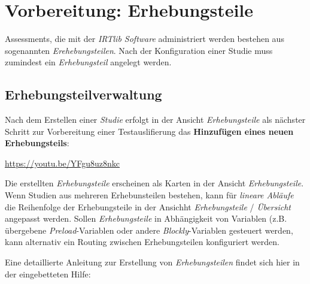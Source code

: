 \documentclass[
  letterpaper,
  DIV=11]{scrreprt}
\begin{document}
\let\clearpage\standardclearpage


\hypertarget{vorbereitung-erhebungsteile-1}{%
\chapter{Vorbereitung:
Erhebungsteile}\label{vorbereitung-erhebungsteile-1}}

Assessments, die mit der \emph{IRTlib Software} administriert werden
bestehen aus sogenannten \emph{Erehebungsteilen}. Nach der Konfiguration
einer Studie muss zumindest ein \emph{Erhebungsteil} angelegt werden.

\hypertarget{erhebungsteilverwaltung-1}{%
\section{Erhebungsteilverwaltung}\label{erhebungsteilverwaltung-1}}

Nach dem Erstellen einer \emph{Studie} erfolgt in der Ansicht
\emph{Erhebungsteile} als nächster Schritt zur Vorbereitung einer
Testauslifierung das \textbf{Hinzufügen eines neuen Erhebungsteils}:

\url{https://youtu.be/YFgu8uz8nkc}

Die erstellten \emph{Erhebungsteile} erscheinen als Karten in der
Ansicht \emph{Erhebungsteile}. Wenn Studien aus mehreren Erhebunsteilen
bestehen, kann für \emph{lineare Abläufe} die Reihenfolge der
Erhebungsteile in der Ansichht \emph{Erhebungsteile} / \emph{Übersicht}
angepasst werden. Sollen \emph{Erhebungsteile} in Abhängigkeit von
Variablen (z.B. übergebene \emph{Preload}-Variablen oder andere
\emph{Blockly}-Variablen gesteuert werden, kann alternativ ein Routing
zwischen Erhebungsteilen konfiguriert werden.

Eine detaillierte Anleitung zur Erstellung von \emph{Erhebungsteilen}
findet sich hier in der eingebetteten Hilfe:
\end{document}

